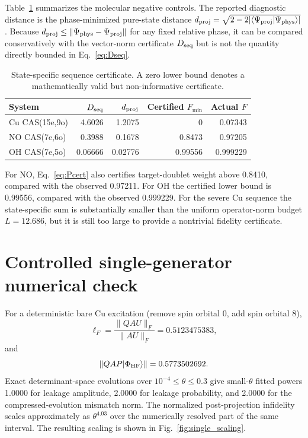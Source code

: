 \documentclass[
 aip,
 jcp,
 amsmath,amssymb,
 preprint
]{revtex4-2}
\begin{document}
Table~\ref{tab:statecert} summarizes the molecular negative controls.
The reported diagnostic distance is the phase-minimized pure-state distance
$d_{\rm proj}=\sqrt{2-2|\langle\Psi_{\rm proj}|\Psi_{\rm phys}\rangle|}$.
Because $d_{\rm proj}\le\|\Psi_{\rm phys}-\Psi_{\rm proj}\|$ for any fixed relative phase, it can be compared conservatively with the vector-norm certificate $D_{\rm seq}$ but is not the quantity directly bounded in Eq.~\ref{eq:Dseq}.
\begin{table}[htbp]
\centering
\small
\caption{State-specific sequence certificate. A zero lower bound denotes a mathematically valid but non-informative certificate.}
\label{tab:statecert}
\begin{tabular}{lrrrr}
\toprule
System & $D_{\rm seq}$ & $d_{\rm proj}$ & Certified $F_{\min}$ & Actual $F$\\
\midrule
Cu CAS(15e,9o) & 4.6026 & 1.2075 & 0 & 0.07343\\
NO CAS(7e,6o) & 0.3988 & 0.1678 & 0.8473 & 0.97205\\
OH CAS(7e,5o) & 0.06666 & 0.02776 & 0.99556 & 0.999229\\
\bottomrule
\end{tabular}
\end{table}
For NO, Eq.~\ref{eq:Pcert} also certifies target-doublet weight above 0.8410, compared with the observed 0.97211.
For OH the certified lower bound is 0.99556, compared with the observed 0.999229.
For the severe Cu sequence the state-specific sum is substantially smaller than the uniform operator-norm budget $L=12.686$, but it is still too large to provide a nontrivial fidelity certificate.

\section{Controlled single-generator numerical check}

For a deterministic bare Cu excitation (remove spin orbital 0, add spin orbital 8),
\begin{equation}
\ell_F=
\frac{\|QAU\|_F}{\|AU\|_F}
=
0.5123475383,
\end{equation}
and
\begin{equation}
\|QAP|\Phi_{\rm HF}\rangle\|
=
0.5773502692.
\end{equation}
Exact determinant-space evolutions over $10^{-4}\le\theta\le0.3$ give small-$\theta$ fitted powers
1.0000 for leakage amplitude,
2.0000 for leakage probability, and
2.0000 for the compressed-evolution mismatch norm.
The normalized post-projection infidelity scales approximately as $\theta^{4.03}$ over the numerically resolved part of the same interval.
The resulting scaling is shown in Fig.~\ref{fig:single_scaling}.
\end{document}
